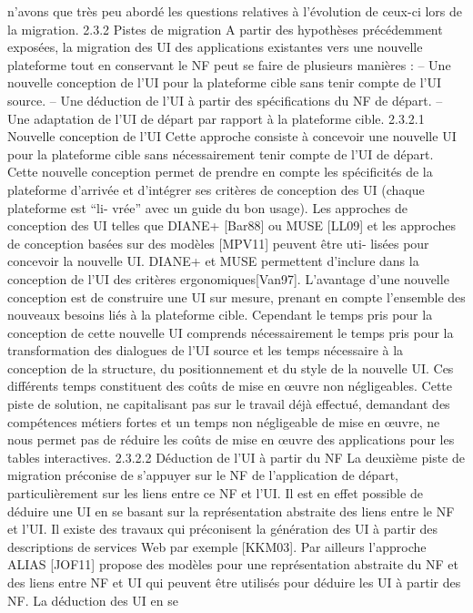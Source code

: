 \documentclass{article}
\begin{document}
n’avons que très peu abordé les questions relatives à l’évolution de ceux-ci lors de la migration.
2.3.2
Pistes de migration
A partir des hypothèses précédemment exposées, la migration des UI des applications existantes
vers une nouvelle plateforme tout en conservant le NF peut se faire de plusieurs manières :
– Une nouvelle conception de l’UI pour la plateforme cible sans tenir compte de l’UI source.
– Une déduction de l’UI à partir des spéciﬁcations du NF de départ.
– Une adaptation de l’UI de départ par rapport à la plateforme cible.
2.3.2.1
Nouvelle conception de l’UI
Cette approche consiste à concevoir une nouvelle UI pour la plateforme cible sans nécessairement
tenir compte de l’UI de départ. Cette nouvelle conception permet de prendre en compte les spéciﬁcités
de la plateforme d’arrivée et d’intégrer ses critères de conception des UI (chaque plateforme est “li-
vrée” avec un guide du bon usage). Les approches de conception des UI telles que DIANE+ [Bar88]
ou MUSE [LL09] et les approches de conception basées sur des modèles [MPV11] peuvent être uti-
lisées pour concevoir la nouvelle UI. DIANE+ et MUSE permettent d’inclure dans la conception de
l’UI des critères ergonomiques[Van97].
L’avantage d’une nouvelle conception est de construire une UI sur mesure, prenant en compte
l’ensemble des nouveaux besoins liés à la plateforme cible. Cependant le temps pris pour la conception
de cette nouvelle UI comprends nécessairement le temps pris pour la transformation des dialogues de
l’UI source et les temps nécessaire à la conception de la structure, du positionnement et du style de
la nouvelle UI. Ces différents temps constituent des coûts de mise en œuvre non négligeables. Cette
piste de solution, ne capitalisant pas sur le travail déjà effectué, demandant des compétences métiers
fortes et un temps non négligeable de mise en œuvre, ne nous permet pas de réduire les coûts de
mise en œuvre des applications pour les tables interactives.
2.3.2.2
Déduction de l’UI à partir du NF
La deuxième piste de migration préconise de s’appuyer sur le NF de l’application de départ,
particulièrement sur les liens entre ce NF et l’UI. Il est en effet possible de déduire une UI en se
basant sur la représentation abstraite des liens entre le NF et l’UI. Il existe des travaux qui préconisent
la génération des UI à partir des descriptions de services Web par exemple [KKM03]. Par ailleurs
l’approche ALIAS [JOF11] propose des modèles pour une représentation abstraite du NF et des liens
entre NF et UI qui peuvent être utilisés pour déduire les UI à partir des NF. La déduction des UI en se
\end{document}
